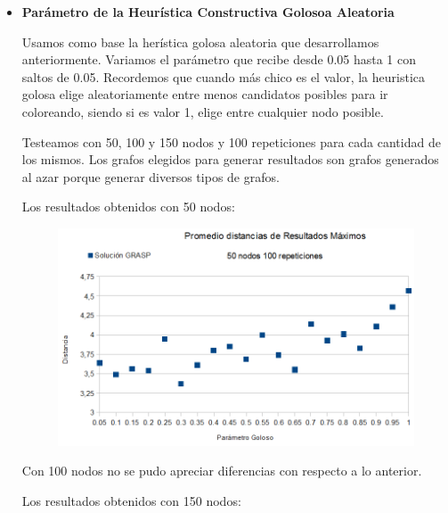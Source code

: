 \begin{itemize}

\item \textbf{Parámetro de la Heurística Constructiva Golosoa Aleatoria}

\quad

\quad Usamos como base la herística golosa aleatoria que desarrollamos anteriormente. Variamos el parámetro que recibe desde 0.05 hasta 1 con saltos de 0.05. Recordemos que cuando más chico es el valor, la heuristica golosa elige aleatoriamente entre menos candidatos posibles para ir coloreando, siendo si es valor 1, elige entre cualquier nodo posible.

\quad Testeamos con 50, 100 y 150 nodos y 100 repeticiones para cada cantidad de los mismos. Los grafos elegidos para generar resultados son grafos generados al azar porque generar diversos tipos de grafos.

\quad

\quad Los resultados obtenidos con 50 nodos:

\begin{figure}[H]
	\centering
	\includegraphics[scale=0.6]{optimizacionGRASPParGoloso1.png}
\end{figure}

\quad

\quad Con 100 nodos no se pudo apreciar diferencias con respecto a lo anterior.

\quad

\quad Los resultados obtenidos con 150 nodos:


\end{itemize}
